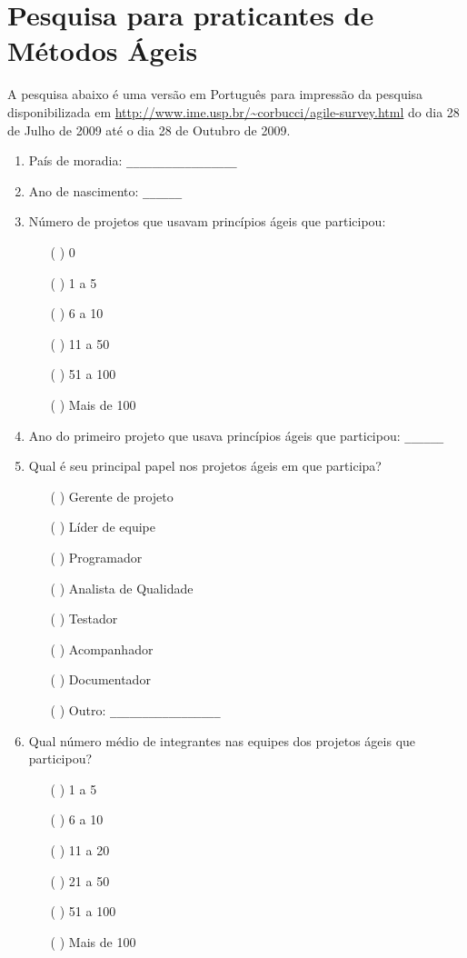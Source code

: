 \chapter{Pesquisa para praticantes de Métodos Ágeis}
\label{ape:MA}

\singlespacing

A pesquisa abaixo é uma versão em Português para impressão da pesquisa
disponibilizada em
\url{http://www.ime.usp.br/~corbucci/agile-survey.html} do dia 28 de
Julho de 2009 até o dia 28 de Outubro de 2009.

\begin{enumerate}
\item País de moradia: \verb=_________________=

\item Ano de nascimento: \verb=______=

\item Número de projetos que usavam princípios ágeis que participou:
  \begin{itemize}
  \item[( )] 0
  \item[( )] 1 a 5
  \item[( )] 6 a 10
  \item[( )] 11 a 50
  \item[( )] 51 a 100
  \item[( )] Mais de 100
  \end{itemize}

\item Ano do primeiro projeto que usava princípios ágeis que
  participou: \verb=______=

\item Qual é seu principal papel nos projetos ágeis em que participa?
  \begin{itemize}
  \item[( )] Gerente de projeto
  \item[( )] Líder de equipe
  \item[( )] Programador
  \item[( )] Analista de Qualidade
  \item[( )] Testador
  \item[( )] Acompanhador
  \item[( )] Documentador
  \item[( )] Outro: \verb=_________________=
  \end{itemize}

\item Qual número médio de integrantes nas equipes dos projetos ágeis
  que participou?
  \begin{itemize}
  \item[( )] 1 a 5
  \item[( )] 6 a 10
  \item[( )] 11 a 20
  \item[( )] 21 a 50
  \item[( )] 51 a 100
  \item[( )] Mais de 100
  \end{itemize}


\end{enumerate}
